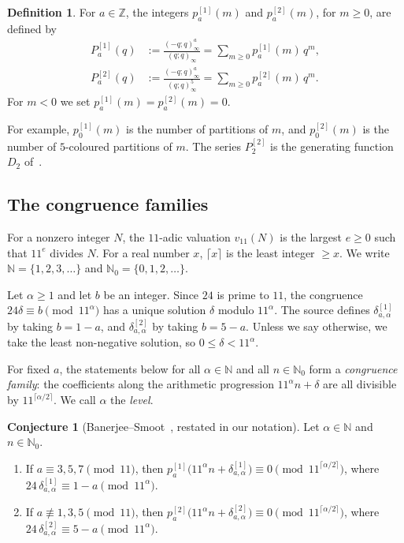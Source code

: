 \documentclass[11pt]{amsart}
\theoremstyle{definition}
\newtheorem{definition}[theorem]{Definition}
\newtheorem{conjecture}[theorem]{Conjecture}
\theoremstyle{remark}
\newcommand{\Z}{\mathbb{Z}}
\newcommand{\N}{\mathbb{N}}
\newcommand{\poch}[2]{(#1;#2)_{\infty}}
\newcommand{\Pone}[1]{P^{[1]}_{#1}}
\newcommand{\Ptwo}[1]{P^{[2]}_{#1}}
\newcommand{\pone}[1]{p^{[1]}_{#1}}
\newcommand{\ptwo}[1]{p^{[2]}_{#1}}
\newcommand{\done}[2]{\delta^{[1]}_{#1,#2}}
\newcommand{\dtwo}[2]{\delta^{[2]}_{#1,#2}}
\newcommand{\val}{v_{11}}
\begin{document}
\begin{definition}\label{def:P}
For \(a\in\Z\), the integers \(\pone{a}(m)\) and \(\ptwo{a}(m)\), for \(m\ge0\), are defined by
\begin{align}
\Pone{a}(q)&:=\frac{\poch{-q}{q}^{a}}{\poch{q}{q}}=\sum_{m\ge0}\pone{a}(m)\,q^m, \label{eq:defP1}\\
\Ptwo{a}(q)&:=\frac{\poch{-q}{q}^{a}}{\poch{q}{q}^{5}}=\sum_{m\ge0}\ptwo{a}(m)\,q^m. \label{eq:defP2}
\end{align}
For \(m<0\) we set \(\pone{a}(m)=\ptwo{a}(m)=0\).
\end{definition}

For example, \(\pone{0}(m)\) is the number of partitions of \(m\), and \(\ptwo{0}(m)\) is the number of \(5\)-coloured partitions of \(m\). The series \(\Ptwo{2}\) is the generating function \(D_2\) of~\cite[Thm.~1.1]{BS}.

\subsection{The congruence families}
For a nonzero integer \(N\), the \(11\)-adic valuation \(\val(N)\) is the largest \(e\ge0\) such that \(11^e\) divides \(N\). For a real number \(x\), \(\lceil x\rceil\) is the least integer \(\ge x\). We write \(\N=\{1,2,3,\dots\}\) and \(\N_0=\{0,1,2,\dots\}\).

Let \(\alpha\ge1\) and let \(b\) be an integer. Since \(24\) is prime to \(11\), the congruence \(24\delta\equiv b\pmod{11^\alpha}\) has a unique solution \(\delta\) modulo \(11^\alpha\). The source defines \(\done{a}{\alpha}\) by taking \(b=1-a\), and \(\dtwo{a}{\alpha}\) by taking \(b=5-a\). Unless we say otherwise, we take the least non-negative solution, so \(0\le\delta<11^\alpha\).

For fixed \(a\), the statements below for all \(\alpha\in\N\) and all \(n\in\N_0\) form a \emph{congruence family}: the coefficients along the arithmetic progression \(11^\alpha n+\delta\) are all divisible by \(11^{\lceil\alpha/2\rceil}\). We call \(\alpha\) the \emph{level}.

\begin{conjecture}[{Banerjee--Smoot~\cite[Conj.~6.1]{BS}, restated in our notation}]\label{conj:BS}
Let \(\alpha\in\N\) and \(n\in\N_0\).
\begin{enumerate}
\item[(1)] If \(a\equiv 3,5,7\pmod{11}\), then \(\pone{a}\bigl(11^\alpha n+\done{a}{\alpha}\bigr)\equiv0\pmod{11^{\lceil\alpha/2\rceil}}\), where \(24\,\done{a}{\alpha}\equiv1-a\pmod{11^\alpha}\).
\item[(2)] If \(a\not\equiv 1,3,5\pmod{11}\), then \(\ptwo{a}\bigl(11^\alpha n+\dtwo{a}{\alpha}\bigr)\equiv0\pmod{11^{\lceil\alpha/2\rceil}}\), where \(24\,\dtwo{a}{\alpha}\equiv5-a\pmod{11^\alpha}\).
\end{enumerate}
\end{conjecture}
\end{document}
